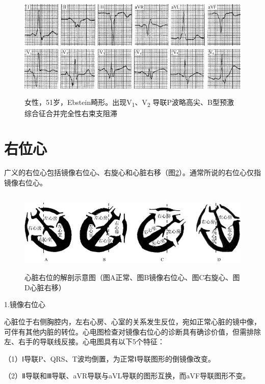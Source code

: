 \begin{figure}[!htbp]
 \centering
 \includegraphics[width=5.08333in,height=1.97917in]{./images/Image00688.jpg}
 \captionsetup{justification=centering}
 \caption{女性，51岁，Ebstein畸形。出现V\textsubscript{1}、V\textsubscript{2} 导联P波略高尖、B型预激综合征合并完全性右束支阻滞}
 \label{fig41-6}
  \end{figure} 


\protect\hypertarget{text00049.htmlux5cux23subid585}{}{}

\section{右位心}

广义的右位心包括镜像右位心、右旋心和心脏右移（图\ref{fig41-7}）。通常所说的右位心仅指镜像右位心。

\begin{figure}[!htbp]
 \centering
 \includegraphics[width=5.58333in,height=1.54167in]{./images/Image00689.jpg}
 \captionsetup{justification=centering}
 \caption{心脏右位的解剖示意图（图A正常、图B镜像右位心、图C右旋心、图D心脏右移）}
 \label{fig41-7}
  \end{figure} 

1.镜像右位心

心脏位于右侧胸腔内，左右心房、心室的关系发生反位，宛如正常心脏的镜中像，可伴有其他内脏的转位。心电图检查对镜像右位心的诊断具有确诊价值，但需排除左、右手的导联线反接。心电图具有以下5个特征：

（1）Ⅰ导联P、QRS、T波均倒置，为正常Ⅰ导联图形的倒镜像改变。

（2）Ⅱ导联和Ⅲ导联、aVR导联与aVL导联的图形互换，而aVF导联图形不变。

